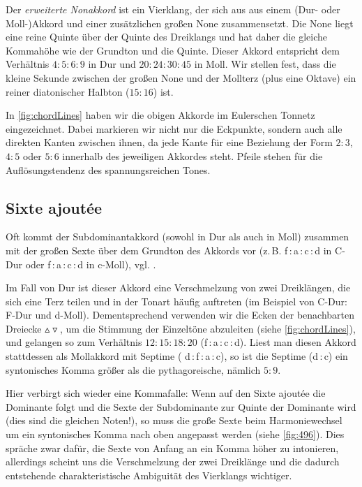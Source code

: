 Der \emph{erweiterte Nonakkord} ist ein Vierklang, der sich aus aus einem (Dur-
oder Moll-)Akkord und einer zusätzlichen großen None zusammensetzt.  Die None
liegt eine reine Quinte über der Quinte des Dreiklangs und hat daher die gleiche
Kommahöhe wie der Grundton und die Quinte. Dieser
Akkord entspricht dem Verhältnis $4:5:6:9$ in Dur und $20:24:30:45$ in Moll. Wir
stellen fest, dass die kleine Sekunde zwischen der großen None und der Mollterz
(plus eine Oktave) ein reiner diatonischer Halbton ($15:16$) ist.

In \cref{fig:chordLines} haben wir die obigen Akkorde im Eulerschen Tonnetz
eingezeichnet. Dabei markieren wir nicht nur die Eckpunkte, sondern auch alle
direkten Kanten zwischen ihnen, da jede Kante für eine Beziehung der Form $2:3$,
$4:5$ oder $5:6$ innerhalb des jeweiligen Akkordes steht. Pfeile stehen für die
Auflösungstendenz des spannungsreichen Tones.

\subsection{Sixte ajoutée}
\label{sec:sixte}

Oft kommt der Subdominantakkord (sowohl in Dur als auch in Moll) zusammen mit
der großen Sexte über dem Grundton des Akkords vor (z.\,B. f\,:\,a\,:\,c\,:\,d
in C-Dur oder f\,:\,\flat a\,:\,c\,:\,d in c-Moll), vgl. \cite[{}9.3]{Skript}.

Im Fall von Dur ist dieser Akkord eine Verschmelzung von zwei Dreiklängen, die
sich eine Terz teilen und in der Tonart häufig auftreten (im Beispiel von C-Dur:
F-Dur und d-Moll). Dementsprechend verwenden wir die Ecken der benachbarten
Dreiecke \mbox{$\vartriangle\!\!\!\triangledown$}, um die Stimmung der
Einzeltöne abzuleiten (siehe \cref{fig:chordLines}), und gelangen so zum
Verhältnis $12:15:18:20$ (f\,:\,\naturalm a\,:\,c\,:\,\natural d).  Liest man
diesen Akkord stattdessen als Mollakkord mit Septime (\naturalm
d\,:\,f\,:\,\naturalm a\,:\,c), so ist die Septime (\naturalm d\,:\,c) ein
syntonisches Komma größer als die pythagoreische, nämlich $5:9$.

Hier verbirgt sich wieder eine Kommafalle: Wenn auf den Sixte ajoutée die
Dominante folgt und die Sexte der Subdominante zur Quinte der Dominante wird
(dies sind die gleichen Noten!), so muss die große Sexte beim Harmoniewechsel um
ein syntonisches Komma nach oben angepasst werden (siehe \cref{fig:496}).  Dies
spräche zwar dafür, die Sexte von Anfang an ein Komma höher zu intonieren,
allerdings scheint uns die Verschmelzung der zwei Dreiklänge und die dadurch
entstehende charakteristische Ambiguität des Vierklangs wichtiger.

